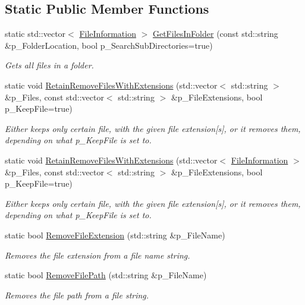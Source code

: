 \subsection*{Static Public Member Functions}
\begin{DoxyCompactItemize}
\item 
static std\+::vector$<$ \mbox{\hyperlink{struct_file_information}{File\+Information}} $>$ \mbox{\hyperlink{class_file_system_helper_a5947b684e4a33586eea9c066ca745bf0}{Get\+Files\+In\+Folder}} (const std\+::string \&p\+\_\+\+Folder\+Location, bool p\+\_\+\+Search\+Sub\+Directories=true)
\begin{DoxyCompactList}\small\item\em Gets all files in a folder. \end{DoxyCompactList}\item 
static void \mbox{\hyperlink{class_file_system_helper_a0f895fcbc7e172821aac5b3b9c689d19}{Retain\+Remove\+Files\+With\+Extensions}} (std\+::vector$<$ std\+::string $>$ \&p\+\_\+\+Files, const std\+::vector$<$ std\+::string $>$ \&p\+\_\+\+File\+Extensions, bool p\+\_\+\+Keep\+File=true)
\begin{DoxyCompactList}\small\item\em Either keeps only certain file, with the given file extension\mbox{[}s\mbox{]}, or it removes them, depending on what p\+\_\+\+Keep\+File is set to. \end{DoxyCompactList}\item 
static void \mbox{\hyperlink{class_file_system_helper_a123a656e26a3e6f30661e96173dee5d7}{Retain\+Remove\+Files\+With\+Extensions}} (std\+::vector$<$ \mbox{\hyperlink{struct_file_information}{File\+Information}} $>$ \&p\+\_\+\+Files, const std\+::vector$<$ std\+::string $>$ \&p\+\_\+\+File\+Extensions, bool p\+\_\+\+Keep\+File=true)
\begin{DoxyCompactList}\small\item\em Either keeps only certain file, with the given file extension\mbox{[}s\mbox{]}, or it removes them, depending on what p\+\_\+\+Keep\+File is set to. \end{DoxyCompactList}\item 
static bool \mbox{\hyperlink{class_file_system_helper_afbd3fec84f5f1212eea6a394162f17bd}{Remove\+File\+Extension}} (std\+::string \&p\+\_\+\+File\+Name)
\begin{DoxyCompactList}\small\item\em Removes the file extension from a file name string. \end{DoxyCompactList}\item 
static bool \mbox{\hyperlink{class_file_system_helper_a44c0bd94522601736244ff130c646824}{Remove\+File\+Path}} (std\+::string \&p\+\_\+\+File\+Name)
\begin{DoxyCompactList}\small\item\em Removes the file path from a file string. \end{DoxyCompactList}\end{DoxyCompactItemize}


